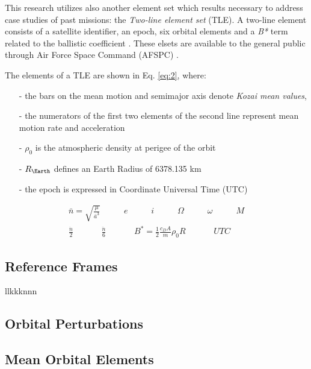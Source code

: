 This research utilizes also another element set which results necessary to address case studies of past missions: the \textit{Two-line element set} (TLE). 
A two-line element consists of a satellite identifier, an epoch, six orbital elements and a \textit{B*} term related to the ballistic coefficient \cite{riesing2015orbit}.
These elsets are available to the general public through Air Force Space Command (AFSPC) \cite{vallado2013fundamentals}.

The elements of a TLE are shown in Eq. \ref{eq:2}, where: 
\begin{itemize}
    \item[-] the bars on  the mean motion and semimajor axis denote \textit{Kozai mean values},
    \item[-] the numerators of the first two elements of the second line represent mean motion rate and acceleration
    \item[-] $\rho_0$ is the atmospheric density at perigee of the orbit
    \item[-] $R_{\Earth}$ defines an Earth Radius of 6378.135 km
    \item[-] the epoch is expressed in Coordinate Universal Time (UTC)
\end{itemize}

\begin{equation} \label{eq:2}
    \begin{split}
        \bar{n}=\sqrt{\frac{\mu}{\bar{a}^{3}}} \;\;\;\;\;\;\;\;\;\; e \;\;\;\;\;\;\;\;\;\; i \;\;\;\;\;\;\;\;\;\; \Omega \;\;\;\;\;\;\;\;\;\; \omega \;\;\;\;\;\;\;\;\;\; M \\
        \frac{\dot{n}}{2} \;\;\;\;\;\;\;\;\;\;\;\; \frac{\ddot{n}}{6} \;\;\;\;\;\;\;\;\;\;\;\; B^* = \frac{1}{2} \frac{c_D A}{m} \rho_0 R \;\;\;\;\;\;\;\;\;\;\;\; UTC
    \end{split}
\end{equation}


\subsection{Reference Frames}
llkkknnn

\subsection{Orbital Perturbations}
\subsection{Mean Orbital Elements}
